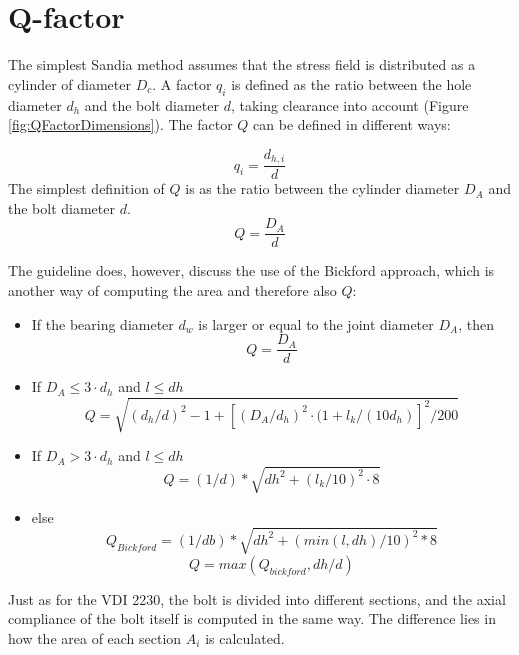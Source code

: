 \documentclass[a4paper,twoside]{bth}
\begin{document}
\section{Q-factor} \label{app:QFactor}
The simplest Sandia method assumes that the stress field is distributed as a cylinder of diameter $D_c$. A factor $q_i$ is defined as the ratio between the hole diameter $d_h$ and the bolt diameter $d$, taking clearance into account (Figure \ref{fig:QFactorDimensions}). The factor $Q$ can be defined in different ways:

\begin{equation}
    q_i = \frac{d_{h, i}}{d}
\end{equation}
The simplest definition of $Q$ is as the ratio between the cylinder diameter $D_A$ and the bolt diameter $d$.
\begin{equation}
    Q = \frac{D_A}{d}
\end{equation}

The guideline does, however, discuss the use of the Bickford approach, which is another way of computing the area and therefore also $Q$:

\begin{itemize}
    \item If the bearing diameter $d_w$ is larger or equal to the joint diameter $D_A$, then
    \begin{equation}
        Q = \frac{D_A}{d}
    \end{equation}
    \item If $D_A \le 3\cdot d_h$ and $l \le dh$
    \begin{equation}
        Q = \sqrt{ (d_h/d)^2 - 1 + [(D_A/d_h)^2 \cdot (1 + l_k/(10d_h)]^2 / 200 }
    \end{equation}
    \item If $D_A > 3\cdot d_h$ and $l \le dh$
    \begin{equation}
        Q = (1/d) * \sqrt{ dh^2 + (l_k/10)^2 \cdot 8 }
    \end{equation}
    \item else
    \begin{equation}
        Q_{Bickford} = (1/db) * \sqrt{ dh^2 + (min(l, dh)/10)^2 * 8 }
    \end{equation}
    \begin{equation}
        Q = max(Q_{bickford}, dh/d)
    \end{equation}
\end{itemize}

Just as for the VDI 2230, the bolt is divided into different sections, and the axial compliance of the bolt itself is computed in the same way. The difference lies in how the area of each section $A_i$ is calculated.
\end{document}
